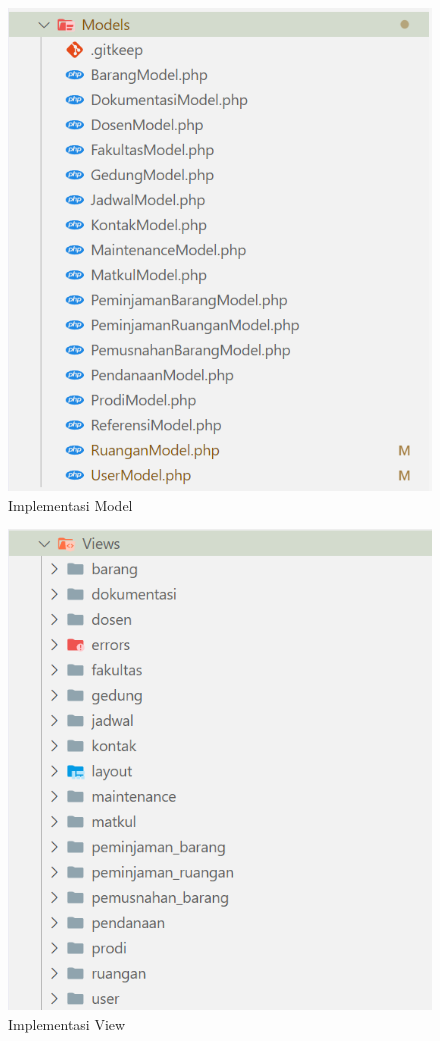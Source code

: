 \begin{figure}
	\centering
	\includegraphics[width=0.82\linewidth]{konten//gambar/implementasi-folder/folder-model.png}
	\caption{Implementasi Model}
	\label{fig:implementasi-model}
\end{figure}

\begin{figure}
	\centering
	\includegraphics[width=0.82\linewidth]{konten//gambar/implementasi-folder/folder-view.png}
	\caption{Implementasi View}
	\label{fig:implementasi-view}
\end{figure}

